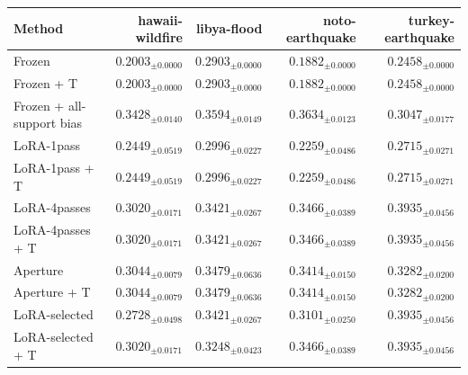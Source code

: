 \begin{tabular}{lrrrr}
\toprule
Method & hawaii-wildfire & libya-flood & noto-earthquake & turkey-earthquake \\
\midrule
Frozen & $0.2003_{\pm 0.0000}$ & $0.2903_{\pm 0.0000}$ & $0.1882_{\pm 0.0000}$ & $0.2458_{\pm 0.0000}$ \\
Frozen + T & $0.2003_{\pm 0.0000}$ & $0.2903_{\pm 0.0000}$ & $0.1882_{\pm 0.0000}$ & $0.2458_{\pm 0.0000}$ \\
Frozen + all-support bias & $0.3428_{\pm 0.0140}$ & $0.3594_{\pm 0.0149}$ & $0.3634_{\pm 0.0123}$ & $0.3047_{\pm 0.0177}$ \\
LoRA-1pass & $0.2449_{\pm 0.0519}$ & $0.2996_{\pm 0.0227}$ & $0.2259_{\pm 0.0486}$ & $0.2715_{\pm 0.0271}$ \\
LoRA-1pass + T & $0.2449_{\pm 0.0519}$ & $0.2996_{\pm 0.0227}$ & $0.2259_{\pm 0.0486}$ & $0.2715_{\pm 0.0271}$ \\
LoRA-4passes & $0.3020_{\pm 0.0171}$ & $0.3421_{\pm 0.0267}$ & $0.3466_{\pm 0.0389}$ & $0.3935_{\pm 0.0456}$ \\
LoRA-4passes + T & $0.3020_{\pm 0.0171}$ & $0.3421_{\pm 0.0267}$ & $0.3466_{\pm 0.0389}$ & $0.3935_{\pm 0.0456}$ \\
Aperture & $0.3044_{\pm 0.0079}$ & $0.3479_{\pm 0.0636}$ & $0.3414_{\pm 0.0150}$ & $0.3282_{\pm 0.0200}$ \\
Aperture + T & $0.3044_{\pm 0.0079}$ & $0.3479_{\pm 0.0636}$ & $0.3414_{\pm 0.0150}$ & $0.3282_{\pm 0.0200}$ \\
LoRA-selected & $0.2728_{\pm 0.0498}$ & $0.3421_{\pm 0.0267}$ & $0.3101_{\pm 0.0250}$ & $0.3935_{\pm 0.0456}$ \\
LoRA-selected + T & $0.3020_{\pm 0.0171}$ & $0.3248_{\pm 0.0423}$ & $0.3466_{\pm 0.0389}$ & $0.3935_{\pm 0.0456}$ \\
\bottomrule
\end{tabular}
